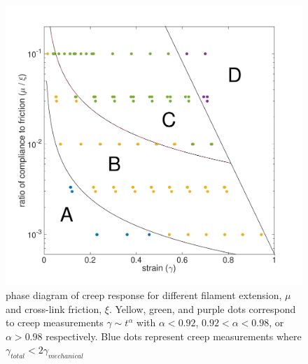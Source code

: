 \documentclass[pre,preprint]{revtex4-1}
\begin{document}
\begin{figure}[h!]
\centering
\includegraphics[width=\hsize]{phase_diag}
\caption{\label{fig:phase_diag} phase diagram of creep response for different filament extension, $\mu$ and cross-link friction, $\xi$.  Yellow, green, and purple dots correspond to creep measurements $\gamma \sim t^\alpha$ with $\alpha<0.92$, $0.92<\alpha<0.98$, or $\alpha>0.98$ respectively.  Blue dots represent creep measurements where $\gamma_{total} < 2\gamma_{mechanical}$}
\end{figure}
\end{document}
